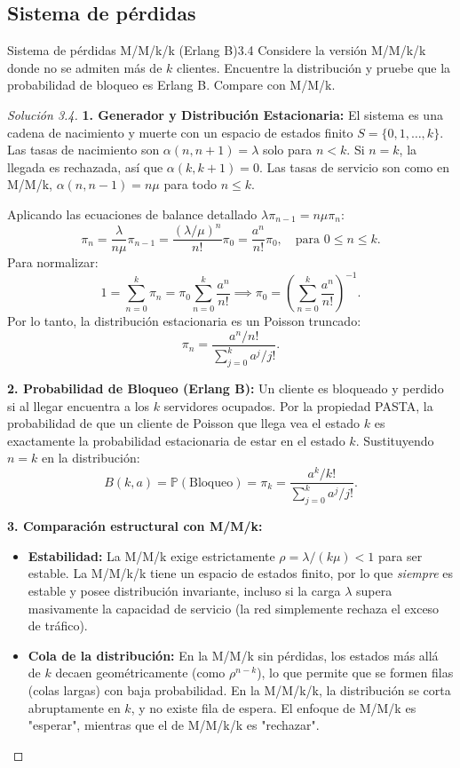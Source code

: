 \documentclass[10pt,a4paper]{article}
\begin{document}
\newpage
\subsection{Sistema de pérdidas}

\begin{ejercicio}{Sistema de pérdidas M/M/k/k (Erlang B)}{3.4}
    Considere la versión M/M/k/k donde no se admiten más de $k$ clientes. Encuentre la distribución y pruebe que la probabilidad de bloqueo es Erlang B. Compare con M/M/k.
\end{ejercicio}

\begin{proof}[Solución  3.4]
    \textbf{1. Generador y Distribución Estacionaria:}
    El sistema es una cadena de nacimiento y muerte con un espacio de estados finito $S = \{0, 1, \dots, k\}$.
    Las tasas de nacimiento son $\alpha(n, n+1) = \lambda$ solo para $n < k$. Si $n = k$, la llegada es rechazada, así que $\alpha(k, k+1) = 0$.
    Las tasas de servicio son como en M/M/k, $\alpha(n, n-1) = n\mu$ para todo $n \le k$.
    
    Aplicando las ecuaciones de balance detallado $\lambda \pi_{n-1} = n\mu \pi_n$:
    \[ \pi_n = \frac{\lambda}{n\mu} \pi_{n-1} = \frac{(\lambda/\mu)^n}{n!} \pi_0 = \frac{a^n}{n!} \pi_0, \quad \text{para } 0 \le n \le k. \]
    Para normalizar:
    \[ 1 = \sum_{n=0}^k \pi_n = \pi_0 \sum_{n=0}^k \frac{a^n}{n!} \implies \pi_0 = \left( \sum_{n=0}^k \frac{a^n}{n!} \right)^{-1}. \]
    Por lo tanto, la distribución estacionaria es un Poisson truncado:
    \[ \pi_n = \frac{a^n / n!}{\sum_{j=0}^k a^j / j!}. \]

    \textbf{2. Probabilidad de Bloqueo (Erlang B):}
    Un cliente es bloqueado y perdido si al llegar encuentra a los $k$ servidores ocupados. Por la propiedad PASTA, la probabilidad de que un cliente de Poisson que llega vea el estado $k$ es exactamente la probabilidad estacionaria de estar en el estado $k$.
    Sustituyendo $n=k$ en la distribución:
    \[ B(k, a) = \mathbb{P}(\text{Bloqueo}) = \pi_k = \frac{a^k / k!}{\sum_{j=0}^k a^j / j!}. \]

    \textbf{3. Comparación estructural con M/M/k:}
    \begin{itemize}
        \item \textbf{Estabilidad:} La M/M/k exige estrictamente $\rho = \lambda/(k\mu) < 1$ para ser estable. La M/M/k/k tiene un espacio de estados finito, por lo que \textit{siempre} es estable y posee distribución invariante, incluso si la carga $\lambda$ supera masivamente la capacidad de servicio (la red simplemente rechaza el exceso de tráfico).
        \item \textbf{Cola de la distribución:} En la M/M/k sin pérdidas, los estados más allá de $k$ decaen geométricamente (como $\rho^{n-k}$), lo que permite que se formen filas (colas largas) con baja probabilidad. En la M/M/k/k, la distribución se corta abruptamente en $k$, y no existe fila de espera. El enfoque de M/M/k es "esperar", mientras que el de M/M/k/k es "rechazar".
    \end{itemize}
\end{proof}
\end{document}
